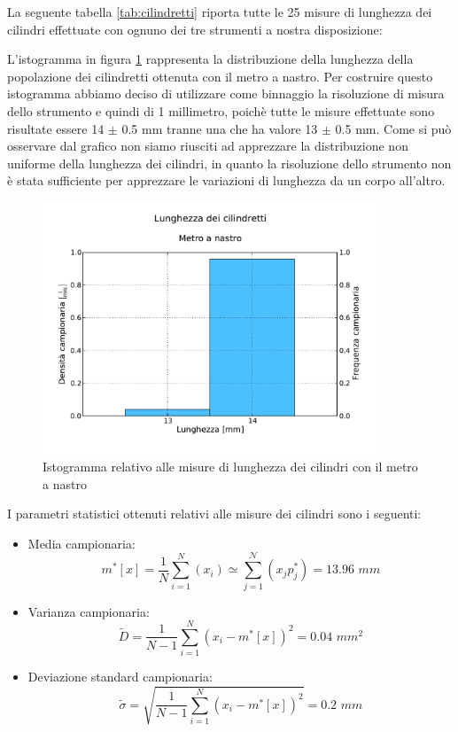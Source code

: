 La seguente tabella \ref{tab:cilindretti} riporta tutte le 25 misure di
lunghezza dei cilindri effettuate con ognuno dei tre strumenti a nostra
disposizione:

L'istogramma in figura \ref{fig:metro} rappresenta la distribuzione della lunghezza della
popolazione dei cilindretti ottenuta con il metro a nastro. Per costruire
questo istogramma abbiamo deciso di utilizzare come binnaggio la risoluzione
di misura dello strumento e quindi di 1 millimetro, poichè tutte le misure
effettuate sono risultate essere 14 $\pm$ 0.5 mm tranne una che ha valore
13 $\pm$ 0.5 mm. Come si può osservare dal grafico non siamo riusciti ad
apprezzare la distribuzione non uniforme della lunghezza dei cilindri,
in quanto la risoluzione dello strumento non è stata sufficiente per
apprezzare le variazioni di lunghezza da un corpo all'altro.

\begin{figure}
	\centering
	\includegraphics[width=100mm]{grafici/Cilindretti_metro.pdf}
	\caption{Istogramma relativo alle misure di lunghezza dei cilindri con il metro a nastro}
	\label{fig:metro}
\end{figure}

I parametri statistici ottenuti relativi alle misure dei cilindri sono
i seguenti:

\begin{itemize}
    \item{Media campionaria:}
        \begin{equation}
        m^*[x] = \frac{1}{N} \sum_{i=1}^{N} (x_i) \simeq \sum_{j=1}^{\mathcal{N}} (x_j p_j^*) = 13.96\,\,mm 
        \end{equation}

    \item{Varianza campionaria:}
        \begin{equation}
        \tilde{D} = \frac{1}{N - 1} \sum_{i=1}^{N} (x_i - m^*[x])^2 = 0.04\,\,mm^2
        \end{equation}

    \item{Deviazione standard campionaria:}
        \begin{equation}
        \tilde{\sigma} = \sqrt{\frac{1}{N - 1} \sum_{i=1}^{N} (x_i - m^*[x])^2} = 0.2\,\,mm
        \end{equation}
\end{itemize}

